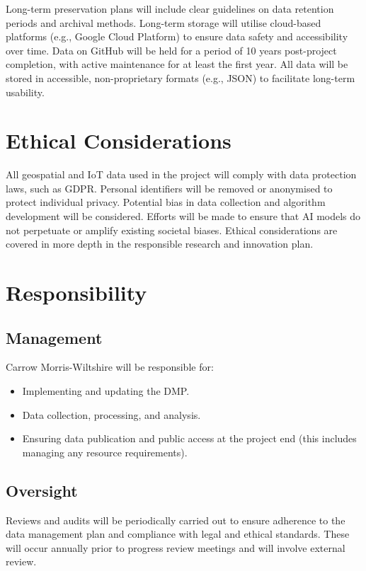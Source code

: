 \documentclass[a4paper, 11pt]{article}
\begin{document}
Long-term preservation plans will include clear guidelines on data retention periods and archival methods. Long-term storage will utilise cloud-based platforms (e.g., Google Cloud Platform) to ensure data safety and accessibility over time. Data on GitHub will be held for a period of 10 years post-project completion, with active maintenance for at least the first year. All data will be stored in accessible, non-proprietary formats (e.g., JSON) to facilitate long-term usability.

\section{Ethical Considerations}

All geospatial and IoT data used in the project will comply with data protection laws, such as GDPR. Personal identifiers will be removed or anonymised to protect individual privacy. Potential bias in data collection and algorithm development will be considered. Efforts will be made to ensure that AI models do not perpetuate or amplify existing societal biases. Ethical considerations are covered in more depth in the responsible research and innovation plan.

\section{Responsibility}

\subsection{Management}

Carrow Morris-Wiltshire will be responsible for:
\begin{itemize}
    \item Implementing and updating the DMP.
    \item Data collection, processing, and analysis.
    \item Ensuring data publication and public access at the project end (this includes managing any resource requirements).
\end{itemize}

\subsection{Oversight}

Reviews and audits will be periodically carried out to ensure adherence to the data management plan and compliance with legal and ethical standards. These will occur annually prior to progress review meetings and will involve external review.
\end{document}
